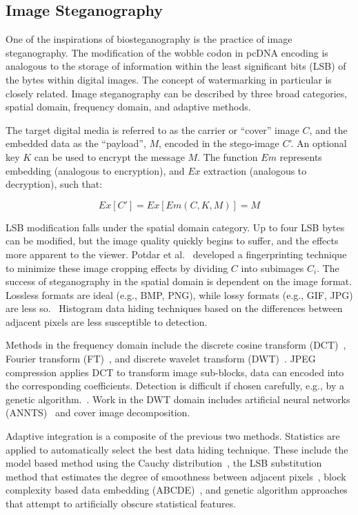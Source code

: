 \documentclass{bioinfo}
\begin{document}
\subsection{Image Steganography}

One of the inspirations of biosteganography is the practice of image steganography. The modification of the wobble codon in pcDNA encoding is analogous to the storage of information within the least significant bits (LSB) of the bytes within digital images. The concept of watermarking in particular is closely related. Image steganography can be described by three broad categories, spatial domain, frequency domain, and adaptive methods.

The target digital media is referred to as the carrier or ``cover'' image $C$, and the embedded data as the ``payload'', $M$, encoded in the stego-image $C$'. An optional key $K$ can be used to encrypt the message $M$. The function $Em$ represents embedding (analogous to encryption), and $Ex$ extraction (analogous to decryption), such that:

\[
	Ex[C'] = Ex[Em(C,K,M)] = M
\]

LSB modification falls under the spatial domain category. Up to four LSB bytes can be modified, but the image quality quickly begins to suffer, and the effects more apparent to the viewer. Potdar et al.~\cite{POTDAR2005} developed a fingerprinting technique to minimize these image cropping effects by dividing $C$ into subimages $C_i$. The success of steganography in the spatial domain is dependent on the image format. Lossless formats are ideal (e.g., BMP, PNG), while lossy formats (e.g., GIF, JPG) are less so.~\cite{JUNG2009} Histogram data hiding techniques based on the differences between adjacent pixels are less susceptible to detection.~\cite{LI2009}

Methods in the frequency domain include the discrete cosine transform (DCT)~\cite{MANIKOPOLOUS2002}, Fourier transform (FT)~\cite{MCKEON2007}, and discrete wavelet transform (DWT)~\cite{CHEN2007,POTDAR2005S,VERMA2005,ABDULAZIZ2000}. JPEG compression applies DCT to transform image sub-blocks, data can encoded into the corresponding coefficients. Detection is difficult if chosen carefully, e.g., by a genetic algorithm.~\cite{FARD2006}. Work in the DWT domain includes artificial neural networks (ANNTS)~\cite{PAULSON2006} and cover image decomposition.~\cite{ABDELWAHAB2008}

Adaptive integration is a composite of the previous two methods. Statistics are applied to automatically select the best data hiding technique. These include the model based method using the Cauchy distribution~\cite{SALLEE2003}, the LSB substitution method that estimates the degree of smoothness between adjacent pixels~\cite{CHANG2004}, block complexity based data embedding (ABCDE)~\cite{HIROHISA2002}, and genetic algorithm approaches that attempt to artificially obscure statistical features.~\cite{WU2006GEN}
\end{document}
